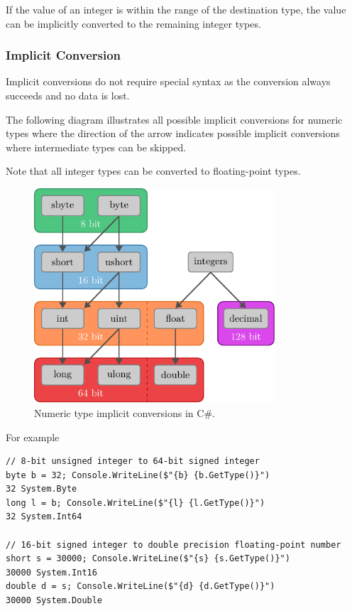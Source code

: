 \documentclass{article}
\def\customlinemarker#1#2{
    \edef\thelstnumber{%
        \unexpanded{%
            \ifnum#1=\value{lstnumber}\relax
              #2%
            \fi}%
        \ifx\thelstnumber\relax\else
        \expandafter\unexpanded\expandafter{\thelstnumber}%
        \fi
    }
}
\begin{document}
If the value of an integer is within the range of the destination type,
the value can be implicitly converted to the remaining integer types.
\subsubsection{Implicit Conversion}
Implicit conversions do not require special syntax as the conversion
always succeeds and no data is lost.

The following diagram illustrates all possible implicit conversions for numeric types
where the direction of the arrow indicates possible implicit conversions where
intermediate types can be skipped.

Note that all integer types can be converted to floating-point types.
\begin{figure}[H]
    \centering
    \includegraphics[height = 8cm, keepaspectratio = true]{figures/implicit_conversions.pdf}
    \caption{Numeric type implicit conversions in C\#.}
\end{figure}
For example
\begingroup
\let\thelstnumber\relax
\customlinemarker{1}{\$}
\customlinemarker{2}{\$}
\customlinemarker{4}{\$}
\customlinemarker{7}{\$}
\customlinemarker{8}{\$}
\customlinemarker{10}{\$}
\begin{lstlisting}
// 8-bit unsigned integer to 64-bit signed integer 
byte b = 32; Console.WriteLine($"{b} {b.GetType()}")
32 System.Byte
long l = b; Console.WriteLine($"{l} {l.GetType()}")
32 System.Int64

// 16-bit signed integer to double precision floating-point number
short s = 30000; Console.WriteLine($"{s} {s.GetType()}")
30000 System.Int16
double d = s; Console.WriteLine($"{d} {d.GetType()}")
30000 System.Double
\end{lstlisting}
\endgroup
\end{document}
